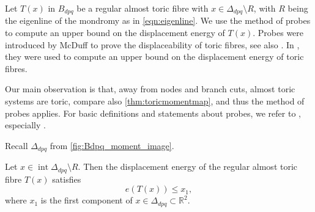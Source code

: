 \documentclass[AIF,Unicode,manuscript]{cedram}
\DeclareMathOperator{\interior}{int}
\begin{document}
Let $T(x)$ in $B_{dpq}$ be a regular almost toric fibre with $x \in \Delta_{dpq} \setminus R$, with $R$ being the eigenline of the mondromy as in \eqref{eqn:eigenline}.
We use the method of probes to compute an upper bound on the displacement energy of $T(x)$.
Probes were introduced by McDuff \cite{mcduff2011displacing} to prove the displaceability of toric fibres, see also \cite{AbrBorMcD14}.
In \cite{brendel2020real}, they were used to compute an upper bound on the displacement energy of toric fibres.

Our main observation is that, away from nodes and branch cuts, almost toric systems are toric, compare also \cref{thm:toricmomentmap}, and thus the method of probes applies.
For basic definitions and statements about probes, we refer to \cite{mcduff2011displacing}, especially \cite[Definition 2.3, Lemma 2.4]{mcduff2011displacing}.

Recall $Δ_{dpq}$ from \cref{fig:Bdpq_moment_image}.


\begin{lemma}
    \label{thm:upper_bound}
    Let $x \in \interior \Delta_{dpq} \setminus R$.
Then the displacement energy of the regular almost toric fibre $T(x)$ satisfies
    \[ e(T(x))\leq x_1, \]
    where $x_1$ is the first component of $x \in \Delta_{dpq} \subset \mathbb{R}^2$.
\end{lemma}
\end{document}
